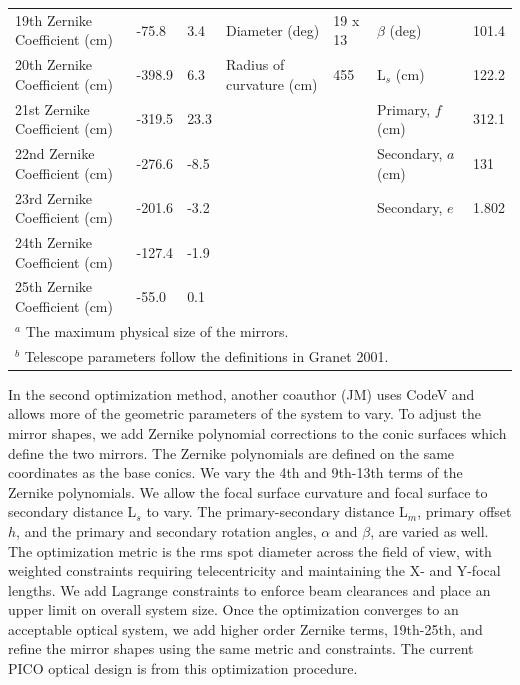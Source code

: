 \documentclass[]{spie}  %
\begin{document}
\begin{table}[ht]
\begin{adjustbox}{width=1.05\textwidth}
\begin{tabular}{|l|llll||ll|}
19th Zernike Coefficient (cm) & -75.8             & 3.4               & Diameter (deg)            & 19 x 13  & $\beta$  (deg)                 & 101.4 \\   
20th Zernike Coefficient (cm) & -398.9            & 6.3               & Radius of curvature (cm)  & 455      & L$_s$ (cm)                     & 122.2 \\   
21st Zernike Coefficient (cm) & -319.5            & 23.3              &                           &          & Primary, $f$ (cm)              & 312.1 \\   
22nd Zernike Coefficient (cm) & -276.6            & -8.5              &                           &          & Secondary, $a$ (cm)            & 131   \\   
23rd Zernike Coefficient (cm) & -201.6            & -3.2              &                           &          & Secondary, $e$                 &  1.802  \\
24th Zernike Coefficient (cm) & -127.4            & -1.9              &                           &          &                                &       \\
25th Zernike Coefficient (cm) & -55.0             & 0.1               &                           &          &                                &       \\\hline
\multicolumn{7}{l}{\footnotesize  $^a$ The maximum physical size of the mirrors.}\\
\multicolumn{7}{l}{\footnotesize  $^b$ Telescope parameters follow the definitions in Granet 2001.\cite{granet2001}} \\
\end{tabular}
\end{adjustbox}
\end{table}

In the second optimization method, another coauthor (JM) uses CodeV and allows more of the geometric 
parameters of the system to vary.  To adjust the 
mirror shapes, we add Zernike polynomial corrections to the conic surfaces which define the two mirrors.
The Zernike polynomials are defined on the same coordinates as the base conics.  
We vary the 4th and 9th-13th terms of the Zernike polynomials. We allow the focal surface curvature 
and focal surface to secondary distance L$_s$ to vary.  The primary-secondary distance L$_m$, primary offset $h$, 
and the primary and secondary rotation angles, $\alpha$ and $\beta$, are varied as well.  The optimization 
metric is the rms spot diameter across the field of view, with weighted constraints requiring telecentricity and 
maintaining the X- and Y-focal lengths.  We add Lagrange constraints 
to enforce beam clearances and place an upper limit on overall system size.  Once the optimization converges to 
an acceptable optical system, we add higher order Zernike terms, 19th-25th, and refine 
the mirror shapes using the same metric and constraints. 
The current PICO optical design is from this optimization procedure.
\end{document}
